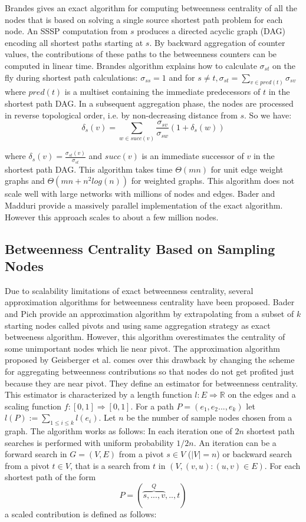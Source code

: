 \documentclass[runningheads,a4paper]{llncs}
\begin{document}
Brandes\cite{brandes} gives an exact algorithm for computing betweenness centrality of all the nodes that is based on solving a single source shortest path problem for each node. An SSSP computation from $s$ produces a directed acyclic graph (DAG) encoding all shortest paths starting at $s$. By backward aggregation of counter values, the contributions of these paths to the betweenness counters can be computed in linear time. Brandes algorithm explains how to calculate $\sigma_{st}$ on the fly during shortest path calculations: $\sigma_{ss} = 1$ and for $s \neq t, \sigma_{st} = \sum_{v \in pred(t)} \sigma_{sv}$ where $pred(t)$ is a multiset containing the immediate predecessors of  $t$ in the shortest path DAG. In a subsequent aggregation phase, the nodes are processed in reverse topological order, i.e. by non-decreasing distance from $s$. So we have: 
$$\delta_{s}(v) = \sum_{w \in succ(v)} \frac{\sigma_{sv}}{\sigma_{sw}}(1+\delta_{s}(w))$$

where $\delta_{s}(v) = \frac{\sigma_{st}(v)}{\sigma_{st}}$ and $succ(v)$ is an immediate successor of $v$  in the shortest path DAG.   
This algorithm takes time $\Theta(mn)$ for unit edge weight graphs and $\Theta(mn + n^{2}log(n))$ for weighted graphs. This algorithm does not scale well with large networks with millions of nodes and edges. Bader and Madduri\cite{bader} provide a massively parallel implementation of the exact algorithm. However this approach scales to about a few million nodes. 

\subsection*{Betweenness Centrality Based on Sampling Nodes}
Due to scalability limitations of exact betweenness centrality, several approximation algorithms for betweenness centrality have been proposed. Bader and Pich\cite{bp} provide an approximation algorithm by extrapolating from a subset of $k$ starting nodes called pivots and using same aggregation strategy as exact betweeness algorithm. However, this algorithm overestimates the centrality of some unimportant nodes which lie near pivot. The approximation algorithm proposed by Geisberger et al. \cite{sanders} comes over this drawback by changing the scheme for aggregating betweenness contributions so that nodes do not get profited just because they are near pivot. They define an estimator for betweenness centrality. This estimator is characterized by a length function $l : E \Rightarrow \mathbb{R}$ on the edges and a scaling function $f : [0,1] \Rightarrow [0,1]$. For a path $P = (e_{1},e_{2}...,e_{k})$ let $l(P) := \sum_{1 \leq i \leq k} l(e_{i})$. Let $n$ be the number of sample nodes chosen from a graph. The algorithm works as follows: In each iteration one of $2n$ shortest path searches is performed with uniform probability $1/2n$. An iteration can be a forward search in $G = (V,E)$ from a pivot $s \in V$ ($|V| = n$) or backward search from a pivot $t \in V$, that is a search from $t$ in $(V,{(v,u) : (u,v) \in E})$. For each shortest path of the form 
$$ P = (\overbrace{s,...,v}^{Q},..,t)$$ 
a scaled contribution is defined as follows:\\
\end{document}
